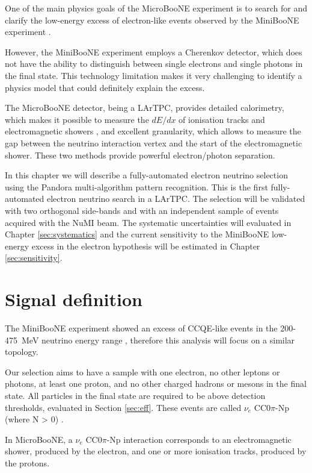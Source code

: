 One of the main physics goals of the MicroBooNE experiment is to search for and clarify the low-energy excess of electron-like events observed by the MiniBooNE experiment \cite{Aguilar-Arevalo:2018gpe}. 

However, the MiniBooNE experiment employs a Cherenkov detector, which does not have the ability to distinguish between single electrons and single photons in the final state. This technology limitation makes it very challenging to identify a physics model that could definitely explain the excess.

The MicroBooNE detector, being a LArTPC, provides detailed  calorimetry, which makes it possible to measure the $dE/dx$ of ionisation tracks and electromagnetic showers \cite{Acciarri:2016sli}, and excellent granularity, which allows to measure the gap between the neutrino interaction vertex and the start of the electromagnetic shower. These two methods provide powerful electron/photon separation.%

In this chapter we will describe a fully-automated electron neutrino selection using the Pandora multi-algorithm pattern recognition. This is the first fully-automated electron neutrino search in a LArTPC. The selection will be validated with two orthogonal side-bands and with an independent sample of events acquired with the NuMI beam. The systematic uncertainties will evaluated in Chapter \ref{sec:systematics} and the current sensitivity to the MiniBooNE low-energy excess in the electron hypothesis will be estimated in Chapter \ref{sec:sensitivity}.

\section{Signal definition}
The MiniBooNE experiment showed an excess of CCQE-like events in the 200-475~MeV neutrino energy range \cite{Aguilar-Arevalo:2018gpe}, therefore this analysis will focus on a similar topology.

Our selection aims to have a sample with one electron, no other leptons or photons, at least one proton, and no other charged hadrons or mesons in the final state. All particles in the final state are required to be above detection thresholds, evaluated in Section \ref{sec:eff}. These events are called $\nu_{e}$ CC0$\pi$-Np (where N > 0) \cite{Katori:2013nca}. 

In MicroBooNE, a $\nu_{e}$ CC0$\pi$-Np interaction corresponds to an electromagnetic shower, produced by the electron, and one or more ionisation tracks, produced by the protons.

